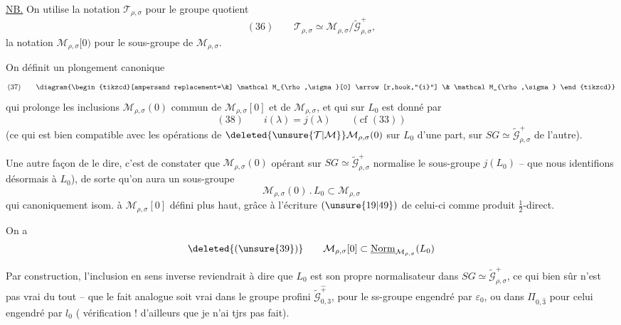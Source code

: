 \uline{NB.} On utilise la notation $\mathcal T_{\rho,\sigma}$ pour le
groupe quotient
\[
(36)\qquad \mathcal T_{\rho,\sigma}\simeq
\mathcal M_{\rho,\sigma}/\widetilde{\mathcal G}_{\rho,\sigma}^{+},
\]
la notation $\mathcal M_{\rho,\sigma}[0)$ pour le sous-groupe
de $\mathcal M_{\rho,\sigma}$.

On définit un plongement canonique
\[
(37)\qquad
\diagram{\begin{tikzcd}[ampersand replacement=\&]
\mathcal M_{\rho,\sigma}[0] \arrow[r,hook,"{i}"] \& \mathcal M_{\rho,\sigma}
\end{tikzcd}}
\]
qui prolonge les inclusions 
$\mathcal M_{\rho,\sigma}(0)$ commun de $\mathcal M_{\rho,\sigma}[0]$
et de $\mathcal M_{\rho,\sigma}$,
et qui sur $L_0$ est donné par
\[
(38)\qquad i(\lambda)=j(\lambda)\qquad (\text{cf }(33))
\]
(ce qui est bien compatible avec les opérations de
$\deleted{\unsure{\mathcal T|\mathcal M}}\mathcal M_{\rho,\sigma}(0)$
sur $L_0$ d'une part, sur $SG\simeq\widetilde{\mathcal G}_{\rho,\sigma}^{+}$
de l'autre).

\par{}


Une autre façon de le dire, c'est de constater que
$\mathcal M_{\rho,\sigma}(0)$ opérant sur
$SG\simeq\widetilde{\mathcal G}_{\rho,\sigma}^{+}$
normalise le sous-groupe $j(L_0)$ -- que nous
identifions désormais à $L_0$), de sorte qu'on
aura un sous-groupe
\[
\mathcal M_{\rho,\sigma}(0)\mathbin{.}L_0\subset\mathcal M_{\rho,\sigma}
\]
qui  canoniquement isom. à $\mathcal M_{\rho,\sigma}[0]$
défini plus haut, grâce à l'écriture $(\unsure{19|49})$ de
celui-ci comme produit $\frac12$-direct.

 On a
\[
\deleted{(\unsure{39})}\qquad
\mathcal M_{\rho,\sigma}[0]\subset
\underline{\operatorname{Norm}}_{\mathcal M_{\rho,\sigma}}(L_0)
\]

Par construction, 
l'inclusion en sens inverse reviendrait à dire que $L_0$
est son propre normalisateur dans $SG\simeq\widetilde{\mathcal G}_{\rho,\sigma}^{+}$,
ce qui bien sûr n'est pas vrai du tout
--  que le fait analogue soit vrai
dans le groupe profini
$\widetilde{\mathcal G}_{0,3}^{\widehat{+}}$,
pour le ss-groupe engendré par $\varepsilon_0$,
ou dans $\Pi_{0,\widehat{3}}$ pour
celui engendré par $l_0$ ( vérification !
d'ailleurs que je n'ai tjrs pas fait).

